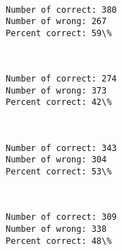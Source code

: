 \documentclass[11pt]{article}
\begin{document}
    \begin{center}
    \end{center}
    { \hspace*{\fill} \\}
    
    \begin{Verbatim}[commandchars=\\\{\}]
Number of correct: 380
Number of wrong: 267
Percent correct: 59\%

    \end{Verbatim}

    \begin{center}
    \end{center}
    { \hspace*{\fill} \\}
    
    \begin{Verbatim}[commandchars=\\\{\}]
Number of correct: 274
Number of wrong: 373
Percent correct: 42\%

    \end{Verbatim}

    \begin{center}
    \end{center}
    { \hspace*{\fill} \\}
    
    \begin{Verbatim}[commandchars=\\\{\}]
Number of correct: 343
Number of wrong: 304
Percent correct: 53\%

    \end{Verbatim}

    \begin{center}
    \end{center}
    { \hspace*{\fill} \\}
    
    \begin{Verbatim}[commandchars=\\\{\}]
Number of correct: 309
Number of wrong: 338
Percent correct: 48\%

    \end{Verbatim}
\end{document}
